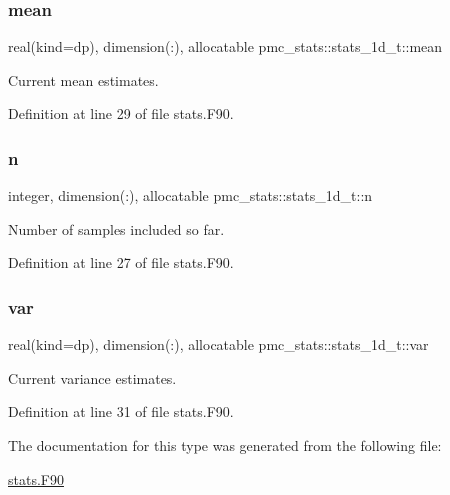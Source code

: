 \subsubsection{\texorpdfstring{mean}{mean}}
{\footnotesize\ttfamily real(kind=dp), dimension(\+:), allocatable pmc\+\_\+stats\+::stats\+\_\+1d\+\_\+t\+::mean}



Current mean estimates. 



Definition at line 29 of file stats.\+F90.

\mbox{\label{structpmc__stats_1_1stats__1d__t_a5c45e606f1fde9de3e1d42f470c4c9e0}} 
\subsubsection{\texorpdfstring{n}{n}}
{\footnotesize\ttfamily integer, dimension(\+:), allocatable pmc\+\_\+stats\+::stats\+\_\+1d\+\_\+t\+::n}



Number of samples included so far. 



Definition at line 27 of file stats.\+F90.

\mbox{\label{structpmc__stats_1_1stats__1d__t_abca7647c4c98a435e74d9da0e4bba750}} 
\subsubsection{\texorpdfstring{var}{var}}
{\footnotesize\ttfamily real(kind=dp), dimension(\+:), allocatable pmc\+\_\+stats\+::stats\+\_\+1d\+\_\+t\+::var}



Current variance estimates. 



Definition at line 31 of file stats.\+F90.



The documentation for this type was generated from the following file\+:\begin{DoxyCompactItemize}
\item 
\mbox{\hyperlink{stats_8_f90}{stats.\+F90}}\end{DoxyCompactItemize}

